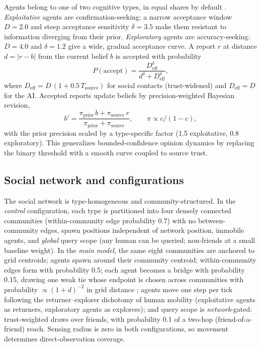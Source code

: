 \documentclass[11pt]{article}
\begin{document}
Agents belong to one of two cognitive types, in equal shares by default
\citep{march1991exploration}. \emph{Exploitative} agents are
confirmation-seeking: a narrow acceptance window $D = 2.0$ and steep
acceptance sensitivity $\delta = 3.5$ make them resistant to information
diverging from their prior. \emph{Exploratory} agents are
accuracy-seeking: $D = 4.0$ and $\delta = 1.2$ give a wide, gradual
acceptance curve. A report $r$ at distance $d = |r - b|$ from the current
belief $b$ is accepted with probability
\begin{equation}
  P(\text{accept}) = \frac{D_{\mathrm{eff}}^{\delta}}{d^{\delta} + D_{\mathrm{eff}}^{\delta}},
  \label{eq:accept}
\end{equation}
where $D_{\mathrm{eff}} = D\,(1 + 0.5\,T_{\mathrm{source}})$ for social
contacts (trust-widened) and $D_{\mathrm{eff}} = D$ for the AI. Accepted
reports update beliefs by precision-weighted Bayesian revision,
\begin{equation}
  b' = \frac{\pi_{\mathrm{prior}}\, b + \pi_{\mathrm{source}}\, r}{\pi_{\mathrm{prior}} + \pi_{\mathrm{source}}},
  \qquad \pi \propto c/(1-c),
  \label{eq:posterior}
\end{equation}
with the prior precision scaled by a type-specific factor (1.5
exploitative, 0.8 exploratory). This generalizes bounded-confidence
opinion dynamics \citep{deffuant2000mixing,hegselmann2002opinion} by
replacing the binary threshold with a smooth curve coupled to source
trust.

\subsection{Social network and configurations}

The social network is type-homogeneous and community-structured. In the
\emph{control} configuration, each type is partitioned into four densely
connected communities (within-community edge probability 0.7) with no
between-community edges, spawn positions independent of network position,
immobile agents, and \emph{global} query scope (any human can be queried;
non-friends at a small baseline weight). In the \emph{main model}, the
same eight communities are anchored to grid centroids; agents spawn
around their community centroid; within-community edges form with
probability 0.5; each agent becomes a bridge with probability 0.15,
drawing one weak tie whose endpoint is chosen across communities with
probability $\propto (1+d)^{-2}$ in grid distance \citep{granovetter1973strength};
agents move one step per tick following the returner--explorer dichotomy
of human mobility (exploitative agents as returners, exploratory agents
as explorers); and query scope is \emph{network}-gated: trust-weighted
draws over friends, with probability 0.1 of a two-hop
(friend-of-a-friend) reach. Sensing radius is zero in both
configurations, so movement determines direct-observation coverage.
\end{document}
